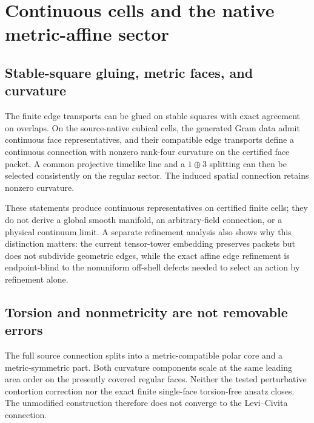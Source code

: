\documentclass[11pt]{article}
\theoremstyle{definition}
\theoremstyle{remark}
\begin{document}
\section{Continuous cells and the native metric-affine sector}

\subsection{Stable-square gluing, metric faces, and curvature}

The finite edge transports can be glued on stable squares with exact agreement on overlaps. On the source-native cubical cells, the generated Gram data admit continuous face representatives, and their compatible edge transports define a continuous connection with nonzero rank-four curvature on the certified face packet. A common projective timelike line and a $1\oplus3$ splitting can then be selected consistently on the regular sector. The induced spatial connection retains nonzero curvature.

These statements produce continuous representatives on certified finite cells; they do not derive a global smooth manifold, an arbitrary-field connection, or a physical continuum limit. A separate refinement analysis also shows why this distinction matters: the current tensor-tower embedding preserves packets but does not subdivide geometric edges, while the exact affine edge refinement is endpoint-blind to the nonuniform off-shell defects needed to select an action by refinement alone.

\subsection{Torsion and nonmetricity are not removable errors}

The full source connection splits into a metric-compatible polar core and a metric-symmetric part. Both curvature components scale at the same leading area order on the presently covered regular faces. Neither the tested perturbative contortion correction nor the exact finite single-face torsion-free ansatz closes. The unmodified construction therefore does not converge to the Levi--Civita connection.
\end{document}
